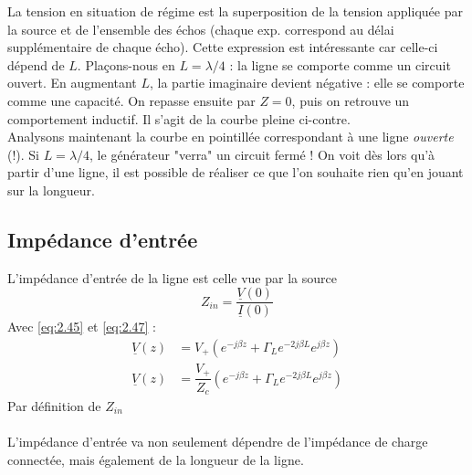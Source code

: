 	La tension en situation de régime est la superposition de la tension appliquée par la source et de 
	l'ensemble des échos (chaque exp. correspond au délai supplémentaire de chaque écho). Cette 
	expression est intéressante car celle-ci dépend de $L$. Plaçons-nous en $L=\lambda/4$ : la ligne 
	se comporte comme un circuit ouvert. En augmentant $L$, la partie imaginaire devient négative : 
	elle se comporte comme une capacité. On repasse ensuite par $Z=0$, puis on retrouve un comportement 
	inductif. Il s'agit de la courbe pleine ci-contre.\\
	Analysons maintenant la courbe en pointillée correspondant à une ligne \textit{ouverte} (!). Si 
	$L=\lambda/4$, le générateur "verra" un circuit fermé ! On voit dès lors qu'à partir d'une ligne, 
	il est possible de réaliser ce que l'on souhaite rien qu'en jouant sur la longueur.
	
	\subsection{Impédance d'entrée}
	L'impédance d'entrée de la ligne est celle vue par la source 
	\begin{equation}
	Z_{in} = \dfrac{\underline{V}(0)}{\underline{I}(0)}
	\end{equation}
	Avec \autoref{eq:2.45} et \autoref{eq:2.47} :
	\begin{equation}
	\begin{array}{ll}
	\underline{V}(z) &= V_+\left(e^{-j\beta z} + \Gamma_L e^{-2j\beta L}e^{j\beta z}\right)\\
	\underline{V}(z) &= \dfrac{V_+}{Z_c} \left(e^{-j\beta z} + \Gamma_L e^{-2j\beta L}e^{j\beta z}\right)	
	\end{array}
	\end{equation}
	Par définition de $Z_{in}$\\
	\ \\
	
	L'impédance d'entrée va non seulement dépendre de l'impédance de charge connectée, mais également de 
	la longueur de la ligne.
	
	
	
	
	
	
	
	
	
	
	
	
	
	
	
	
	
	
	
	
	
	
	
	
	
	
	
	
	
	
	
	
	
	
	
	
	
	
	



